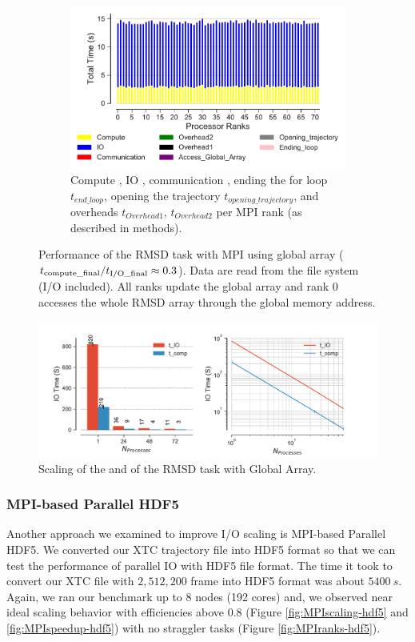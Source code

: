 \begin{figure}
\begin{subfigure} {.8\textwidth}
  \includegraphics[width=\linewidth]{figures/split-ga-BarPlot-rank-comparison_72_5.pdf}
  \caption{Compute \tcomp, IO \tIO, communication \tcomm , ending the for loop $t_{end\_loop}$,
  opening the trajectory $t_{opening\_trajectory}$, and overheads $t_{Overhead1}$,  $t_{Overhead2}$ per MPI rank (as described in methods).}
  \label{fig:MPIranks-split-ga}
\end{subfigure}
%
\caption{Performance of the RMSD task with MPI using global array (${t}_{\text{compute\_final}}/{t}_{\text{I/O\_final}} \approx 0.3$).
Data are read from the file system (I/O included). All ranks update the global array and rank 0 accesses the whole RMSD array through the global memory address.}
\label{fig:MPIwithIO-split-ga}
\end{figure}

\begin{figure}
\centering
  \includegraphics[width=\linewidth]{figures/split-ga-time_IO_comparison.pdf}
\caption{Scaling of the \tcomp and \tIO of the RMSD task with Global Array.}
\label{fig:ScalingComputeIO-split-ga}
\end{figure}

\subsubsection{MPI-based Parallel HDF5}
\label{HDF5}
Another approach we examined to improve I/O scaling is MPI-based Parallel HDF5. 
We converted our XTC trajectory file into HDF5 format so that we can test the performance of parallel IO with HDF5 file format.
The time it took to convert our XTC file with $2,512,200$ frame into HDF5 format was about $5400~s$.
Again, we ran our benchmark up to 8 nodes (192 cores) and, we observed near ideal scaling behavior with efficiencies above 0.8 (Figure \ref{fig:MPIscaling-hdf5} and \ref{fig:MPIspeedup-hdf5}) with no straggler tasks (Figure \ref{fig:MPIranks-hdf5}).  

